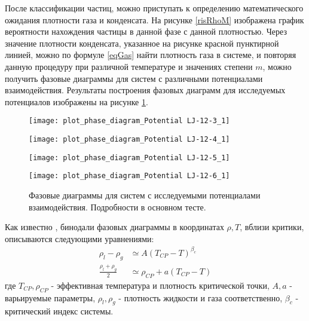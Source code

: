 После классификации частиц, можно приступать к определению математического ожидания плотности газа и конденсата. На рисунке \ref{risRhoM} изображена график вероятности нахождения частицы в данной фазе с данной плотностью. Через значение плотности конденсата, указанное на рисунке красной пунктирной линией, можно по формуле \ref{eqGas} найти плотность газа в системе, и повторяя данную процедуру при различной температуре и значениях степени $m$, можно получить фазовые диаграммы для систем с различными потенциалами взаимодействия. Результаты построения фазовых диаграмм для исследуемых потенциалов изображены на рисунке \ref{risPhaseDiagrammExp}.

\begin{figure}[h]
\begin{center}
\begin{minipage}[h]{0.45\linewidth}
\texttt{[image: plot\_phase\_diagram\_Potential LJ-12-3\_1]}
\end{minipage}
\begin{minipage}[h]{0.45\linewidth}
\texttt{[image: plot\_phase\_diagram\_Potential LJ-12-4\_1]}
\end{minipage}

\begin{minipage}[h]{0.45\linewidth}
\texttt{[image: plot\_phase\_diagram\_Potential LJ-12-5\_1]}
\end{minipage}
\begin{minipage}[h]{0.45\linewidth}
\texttt{[image: plot\_phase\_diagram\_Potential LJ-12-6\_1]}
\end{minipage}
\caption{Фазовые диаграммы для систем с исследуемыми потенциалами взаимодействия. Подробности в основном тесте.}
\label{risPhaseDiagrammExp}
\end{center}
\end{figure}

Как известно \cite{fitPhase}, бинодали фазовых диаграммы в координатах $\rho, T$, вблизи критики, описываются следующими уравнениями:
\begin{equation}
\begin{aligned}
\rho_l - \rho_g &\simeq A (T_{CP} - T)^{\beta_c} \\
\frac{\rho_l + \rho_g}{2} &\simeq \rho_{CP} + a(T_{CP} - T)
\end{aligned}
\label{eqFitFhase}
\end{equation}
где $T_{CP}, \rho_{CP}$ - эффективная температура и плотность критической точки, $A, a$ - варьируемые параметры, $\rho_l, \rho_g$ - плотность жидкости и газа соответственно, $\beta_c$ - критический индекс системы.

